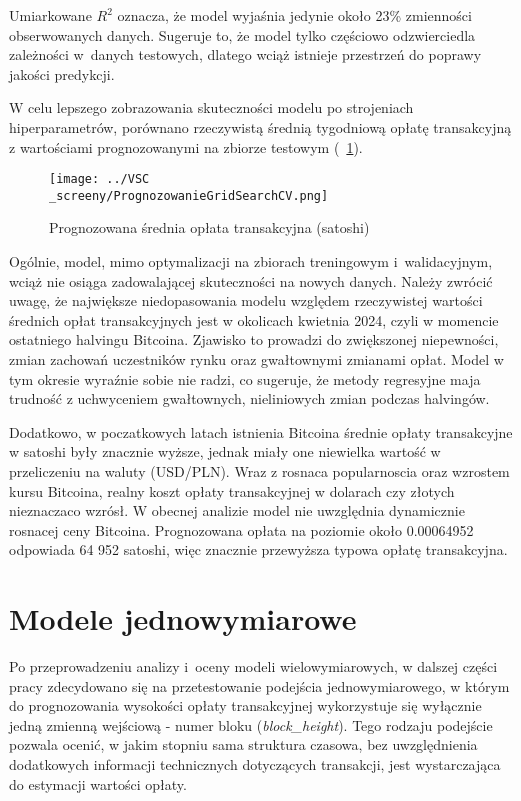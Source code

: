 \documentclass[12pt,a4paper]{report}
\theoremstyle{definition} %
\begin{document}
	Umiarkowane $R^2$ oznacza, że model wyjaśnia jedynie około 23\% zmienności obserwowanych danych. Sugeruje to, że model tylko częściowo odzwierciedla zależności w~danych testowych, dlatego wciąż istnieje przestrzeń do poprawy jakości predykcji.

	W celu lepszego zobrazowania skuteczności modelu po strojeniach hiperparametrów, porównano rzeczywistą średnią tygodniową opłatę transakcyjną z wartościami prognozowanymi na zbiorze testowym (\figurename~\ref{fig:PrognozaGridSearchCV}).

	\begin{figure}[H]
	    \centering
	    \texttt{[image: ../VSC\\\_screeny/PrognozowanieGridSearchCV.png]} 
	    \caption{Prognozowana średnia opłata transakcyjna (satoshi)}
	    \label{fig:PrognozaGridSearchCV}
	\end{figure}

	Ogólnie, model, mimo optymalizacji na zbiorach treningowym i~walidacyjnym, wciąż nie osiąga zadowalającej skuteczności na nowych danych. Należy zwrócić uwagę, że największe niedopasowania modelu względem rzeczywistej wartości średnich opłat transakcyjnych jest w okolicach kwietnia 2024, czyli w momencie ostatniego halvingu Bitcoina. Zjawisko to prowadzi do zwiększonej niepewności, zmian zachowań uczestników rynku oraz gwałtownymi zmianami opłat. Model w tym okresie wyraźnie sobie nie radzi, co sugeruje, że metody regresyjne maja trudność z uchwyceniem gwałtownych, nieliniowych zmian podczas halvingów.  

Dodatkowo, w poczatkowych latach istnienia Bitcoina średnie opłaty transakcyjne w satoshi były znacznie wyższe, jednak miały one niewielka wartość w przeliczeniu na waluty (USD/PLN). \enlargethispage{2\baselineskip} Wraz z rosnaca popularnoscia oraz wzrostem kursu Bitcoina, realny koszt opłaty transakcyjnej w dolarach czy złotych nieznaczaco wzrósł. W obecnej analizie model nie uwzględnia dynamicznie rosnacej ceny Bitcoina. Prognozowana opłata na poziomie około  0.00064952 odpowiada 64 952 satoshi, więc znacznie przewyższa typowa opłatę transakcyjna.

	\section{Modele jednowymiarowe}
	\hspace*{\parindent}Po przeprowadzeniu analizy i~oceny modeli wielowymiarowych, w dalszej części pracy zdecydowano się na przetestowanie podejścia jednowymiarowego, w którym do prognozowania wysokości opłaty transakcyjnej wykorzystuje się wyłącznie jedną zmienną wejściową - numer bloku (\textit{block\_height}). Tego rodzaju podejście pozwala ocenić, w jakim stopniu sama struktura czasowa, bez uwzględnienia dodatkowych informacji technicznych dotyczących transakcji, jest wystarczająca do estymacji wartości opłaty.
\end{document}
